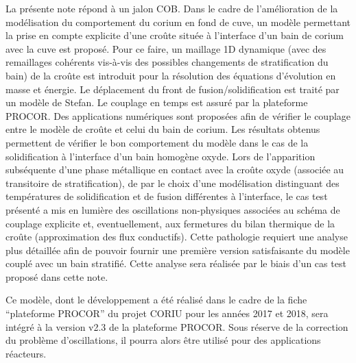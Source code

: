 La présente note répond à un jalon COB. Dans le cadre de l’amélioration de la modélisation du comportement du corium en fond de cuve, un modèle permettant la prise en compte explicite d’une croûte située à l’interface d’un bain de
corium avec la cuve est proposé. Pour ce faire, un maillage 1D dynamique (avec des remaillages cohérents vis-à-vis des possibles changements de stratification du bain) de la croûte est introduit pour la résolution des équations d’évolution en masse et énergie. Le déplacement du front de fusion/solidification est traité par un modèle de Stefan. Le couplage en temps est assuré par la plateforme PROCOR. Des applications numériques sont proposées afin de vérifier le couplage entre le modèle de croûte et celui du bain de corium. Les résultats obtenus permettent de vérifier le bon comportement du modèle dans le cas de la solidification à l'interface d'un bain homogène oxyde. Lors de l'apparition  subséquente d'une phase métallique en contact avec la croûte oxyde (associée au transitoire de stratification), de par le choix d'une modélisation distinguant des températures de solidification et de fusion différentes à l'interface, le cas test présenté a mis en lumière des oscillations non-physiques associées au schéma de couplage explicite et, eventuellement, aux fermetures du bilan thermique de la croûte (approximation des flux conductifs). Cette pathologie requiert une analyse plus détaillée afin de pouvoir fournir une première version satisfaisante du modèle couplé avec un bain stratifié. Cette analyse sera réalisée par le biais d'un cas test proposé dans cette note.

Ce modèle, dont le développement a été réalisé dans le cadre de la fiche ``plateforme PROCOR'' du projet CORIU pour les années 2017 et 2018, sera intégré à la version v2.3 de la plateforme PROCOR. Sous réserve de la correction du problème d'oscillations, il pourra alors être utilisé pour des applications réacteurs.
